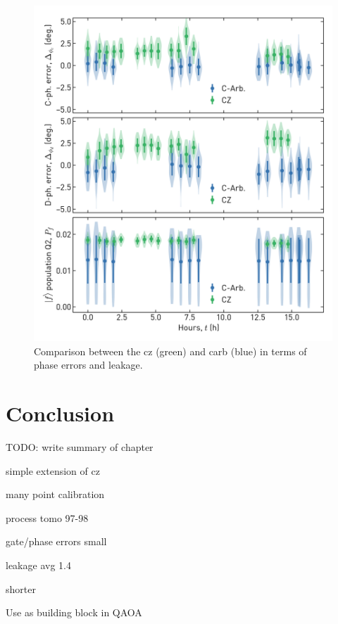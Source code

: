 \begin{figure}[ht]
    \centering
    \includegraphics[width=\textwidth]{chapters/carb_gate/figs/ch4_characterization_drift_20200124_175455.png}
    \caption{Comparison between the \gls{cz} (green) and \gls{carb} (blue) in terms of phase errors and leakage.}
    \label{fig:carb_characterization_drift}
\end{figure}

\section{Conclusion}
TODO: write summary of chapter

simple extension of cz

many point calibration

process tomo 97-98

gate/phase errors small

leakage avg 1.4

shorter

Use as building block in QAOA


